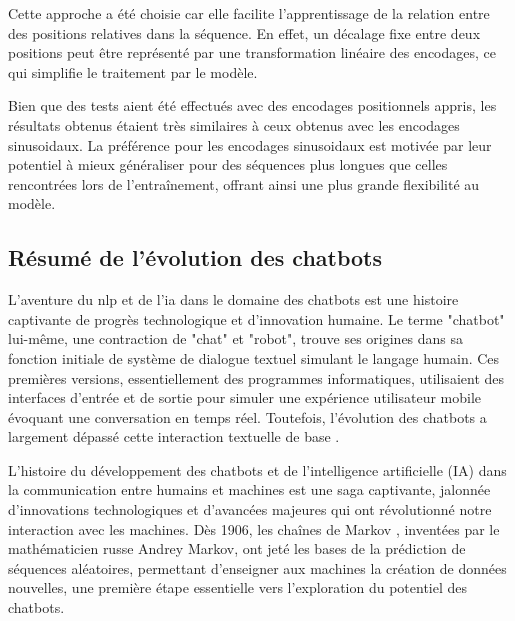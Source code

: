 Cette approche a été choisie car elle facilite l'apprentissage de la relation entre des positions relatives dans la séquence. En effet, un décalage fixe entre deux positions peut être représenté par une transformation linéaire des encodages, ce qui simplifie le traitement par le modèle.

Bien que des tests aient été effectués avec des encodages positionnels appris, les résultats obtenus étaient très similaires à ceux obtenus avec les encodages sinusoidaux. La préférence pour les encodages sinusoidaux est motivée par leur potentiel à mieux généraliser pour des séquences plus longues que celles rencontrées lors de l'entraînement, offrant ainsi une plus grande flexibilité au modèle.

\subsection{Résumé de l'évolution des chatbots}
\label{ch:1:section:history}

L'aventure du \acf{nlp} et de l'\acf{ia} dans le domaine des chatbots est une histoire captivante de progrès technologique et d'innovation humaine. Le terme "chatbot" lui-même, une contraction de "chat" et "robot", trouve ses origines dans sa fonction initiale de système de dialogue textuel simulant le langage humain. Ces premières versions, essentiellement des programmes informatiques, utilisaient des interfaces d'entrée et de sortie pour simuler une expérience utilisateur mobile évoquant une conversation en temps réel. Toutefois, l'évolution des chatbots a largement dépassé cette interaction textuelle de base \cite{alamin2024history}.

L'histoire du développement des chatbots et de l'intelligence artificielle (IA) dans la communication entre humains et machines est une saga captivante, jalonnée d'innovations technologiques et d'avancées majeures qui ont révolutionné notre interaction avec les machines. Dès 1906, les chaînes de Markov \cite{Green1996MarkovCM}, inventées par le mathématicien russe Andrey Markov, ont jeté les bases de la prédiction de séquences aléatoires, permettant d'enseigner aux machines la création de données nouvelles, une première étape essentielle vers l'exploration du potentiel des chatbots.

